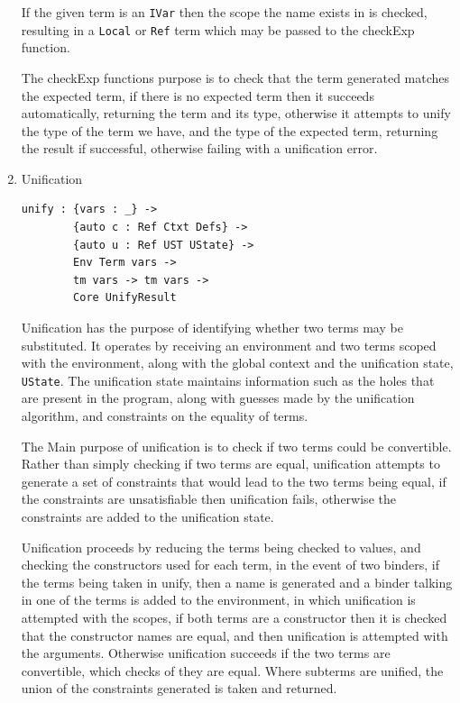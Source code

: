 \documentclass[a4paper]{article}
\begin{document}
\begin{enumerate}
If the given term is an \texttt{IVar} then the scope the name exists in is checked,
resulting in a \texttt{Local} or \texttt{Ref} term which may be passed to the checkExp function. 

The checkExp functions purpose is to check that the term generated
matches the expected term, if there is no expected term then it 
succeeds automatically, returning the term and its type, otherwise it attempts to 
unify the type of the term we have, and the type of the expected term, 
returning the result if successful, otherwise failing with a unification error. 

\item Unification
\label{sec:org292bf4c}

\begin{center}
\begin{verbatim}
unify : {vars : _} ->
		{auto c : Ref Ctxt Defs} ->
		{auto u : Ref UST UState} ->
		Env Term vars ->
		tm vars -> tm vars ->
		Core UnifyResult
\end{verbatim}
\end{center}
Unification has the purpose of identifying whether two terms may be substituted.
It operates by receiving an environment and two terms scoped 
with the environment, along with the global context and the unification
state, \texttt{UState}. The unification state maintains information such as 
the holes that are present in the program, along with guesses made by 
the unification algorithm, and constraints on the equality of terms.

The Main purpose of unification is to check if two terms could be 
convertible. Rather than simply checking if two terms are equal, 
unification attempts to generate a set of constraints that would lead 
to the two terms being equal, if the constraints are unsatisfiable then
unification fails, otherwise the constraints are added to the
unification state. 

Unification proceeds by reducing the terms being checked to values, and
checking the constructors used for each term, in the event of two binders, 
if the terms being taken in unify, then a name is generated and a 
binder talking in one of the terms is added to the environment, in which
unification is attempted with the scopes, if both terms are a constructor
then it is checked that the constructor names are equal, and then unification
is attempted with the arguments. Otherwise unification succeeds if the
two terms are convertible, which checks of they are equal. Where subterms
are unified, the union of the constraints generated is taken and returned.  


\end{enumerate}
\end{document}
